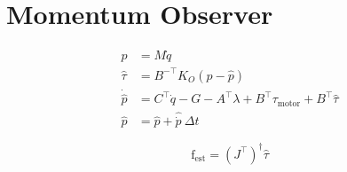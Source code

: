 \documentclass[11pt]{article}
\newcommand{\T}{^\top}          %
\begin{document}
\section*{Momentum Observer}

\begin{align*}
  p &= M \dot{q}\\
  \hat{\tau} &= B^{-\top} K_O(p - \hat{p})\\
  \dot{\hat{p}} &= C\T \dot{q} - G - A\T \lambda + B\T \tau_{\text{motor}} + B\T \hat{\tau}\\
  \hat{p} &= \hat{p} + \hat{\dot{p}} \ \Delta t
\end{align*}

\[
\mathrm{f}_{\text{est}} = ({J}\T)^\dagger \hat{\tau}
\]
\end{document}
